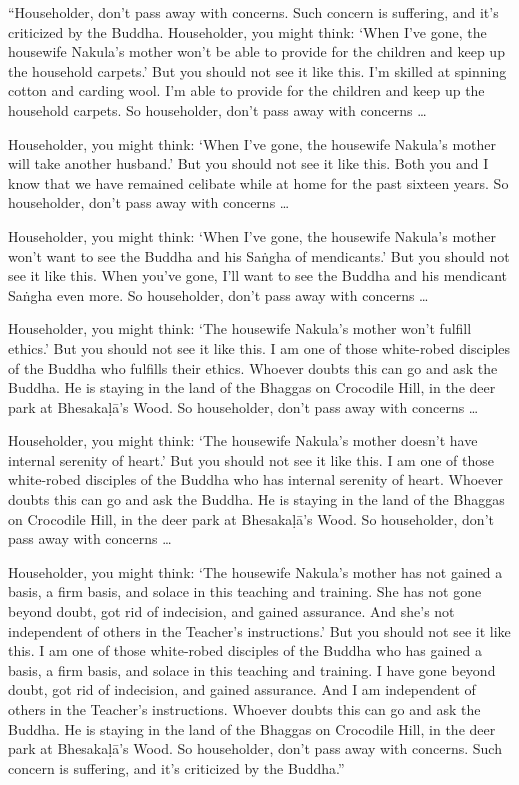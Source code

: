 \documentclass[12pt,openany]{book}%
\begin{document}
“Householder, don’t pass away with concerns. Such concern is suffering, and it’s criticized by the Buddha. Householder, you might think: ‘When I’ve gone, the housewife Nakula’s mother won’t be able to provide for the children and keep up the household carpets.’ But you should not see it like this. I’m skilled at spinning cotton and carding wool. I’m able to provide for the children and keep up the household carpets. So householder, don’t pass away with concerns … 

Householder, you might think: ‘When I’ve gone, the housewife Nakula’s mother will take another husband.’ But you should not see it like this. Both you and I know that we have remained celibate while at home for the past sixteen years. So householder, don’t pass away with concerns … 

Householder, you might think: ‘When I’ve gone, the housewife Nakula’s mother won’t want to see the Buddha and his \textsanskrit{Saṅgha} of mendicants.’ But you should not see it like this. When you’ve gone, I’ll want to see the Buddha and his mendicant \textsanskrit{Saṅgha} even more. So householder, don’t pass away with concerns … 

Householder, you might think: ‘The housewife Nakula’s mother won’t fulfill ethics.’ But you should not see it like this. I am one of those white-robed disciples of the Buddha who fulfills their ethics. Whoever doubts this can go and ask the Buddha. He is staying in the land of the Bhaggas on Crocodile Hill, in the deer park at \textsanskrit{Bhesakaḷā}’s Wood. So householder, don’t pass away with concerns … 

Householder, you might think: ‘The housewife Nakula’s mother doesn’t have internal serenity of heart.’ But you should not see it like this. I am one of those white-robed disciples of the Buddha who has internal serenity of heart. Whoever doubts this can go and ask the Buddha. He is staying in the land of the Bhaggas on Crocodile Hill, in the deer park at \textsanskrit{Bhesakaḷā}’s Wood. So householder, don’t pass away with concerns … 

Householder, you might think: ‘The housewife Nakula’s mother has not gained a basis, a firm basis, and solace in this teaching and training. She has not gone beyond doubt, got rid of indecision, and gained assurance. And she’s not independent of others in the Teacher’s instructions.’ But you should not see it like this. I am one of those white-robed disciples of the Buddha who has gained a basis, a firm basis, and solace in this teaching and training. I have gone beyond doubt, got rid of indecision, and gained assurance. And I am independent of others in the Teacher’s instructions. Whoever doubts this can go and ask the Buddha. He is staying in the land of the Bhaggas on Crocodile Hill, in the deer park at \textsanskrit{Bhesakaḷā}’s Wood. So householder, don’t pass away with concerns. Such concern is suffering, and it’s criticized by the Buddha.” 
\end{document}
